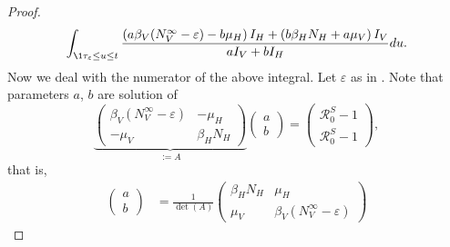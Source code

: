 \begin{proof}
\begin{equation}
            \int_{\1{\tau_\varepsilon \leq u \leq t}}
                \frac{
                    \left(
                        a \beta_V (N_V ^ \infty - \varepsilon) - b \mu_H
                    \right) I_H
                    +
                    \left(
                        b \beta_H N_H + a \mu_V
                    \right) I_V
                }{a I_V + bI_H}
                du .
    \end{equation}
    Now we deal with the numerator of the above integral. Let $\varepsilon$
    as in . Note that
    parameters $a$, $b$ are solution of
    \begin{equation*}
        \underbrace{
            \begin{pmatrix}
                \beta_V \left(N_V ^ {\infty} -\varepsilon\right)
                    & - \mu_H 
                \\
                - \mu_V
                    & \beta_H N_H
            \end{pmatrix}
        }_{:=A}
%
        \begin{pmatrix}
            a
            \\
            b
        \end{pmatrix}
        =
        \begin{pmatrix}
            \mathcal{R}_0 ^ S - 1
            \\
            \mathcal{R}_0 ^ S - 1
        \end{pmatrix},
    \end{equation*}
    that is,
    \begin{equation} \label{eqn:ab_as_linear_solution}
        \begin{aligned}
            \begin{pmatrix}
                a
                \\
                b
            \end{pmatrix}
            & =
            \frac{1}{\det(A)}
            \begin{pmatrix}
                \beta_H N_H
                    & \mu_H
                \\
                \mu_V
                    & \beta_V \left(N_V ^ {\infty} -\varepsilon\right)
                    

\end{pmatrix}
\end{aligned}
\end{equation}
\end{proof}
